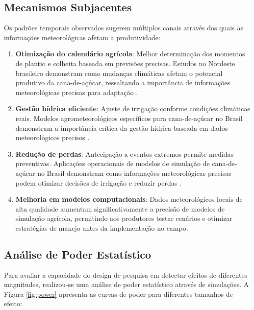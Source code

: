 \documentclass[
	12pt,				%
	oneside,			%
	a4paper,			%
	english,			%
	french,				%
	spanish,			%
	brazil				%
	]{abntex2}
\begin{document}
\subsection{Mecanismos Subjacentes}

Os padrões temporais observados sugerem múltiplos canais através dos quais as informações meteorológicas afetam a produtividade:

\begin{enumerate}
\item \textbf{Otimização do calendário agrícola}: Melhor determinação dos momentos de plantio e colheita baseada em previsões precisas. Estudos no Nordeste brasileiro demonstram como mudanças climáticas afetam o potencial produtivo da cana-de-açúcar, ressaltando a importância de informações meteorológicas precisas para adaptação \cite{carvalho2015}.

\item \textbf{Gestão hídrica eficiente}: Ajuste de irrigação conforme condições climáticas reais. Modelos agrometeorológicos específicos para cana-de-açúcar no Brasil demonstram a importância crítica da gestão hídrica baseada em dados meteorológicos precisos \cite{monteiro2017, marin2015}.

\item \textbf{Redução de perdas}: Antecipação a eventos extremos permite medidas preventivas. Aplicações operacionais de modelos de simulação de cana-de-açúcar no Brasil demonstram como informações meteorológicas precisas podem otimizar decisões de irrigação e reduzir perdas \cite{vianna2016}.

\item \textbf{Melhoria em modelos computacionais}: Dados meteorológicos locais de alta qualidade aumentam significativamente a precisão de modelos de simulação agrícola, permitindo aos produtores testar cenários e otimizar estratégias de manejo antes da implementação no campo.

\end{enumerate}

\subsection{Análise de Poder Estatístico}

Para avaliar a capacidade do design de pesquisa em detectar efeitos de diferentes magnitudes, realizou-se uma análise de poder estatístico através de simulações. A Figura \ref{fig:power} apresenta as curvas de poder para diferentes tamanhos de efeito:
\end{document}
